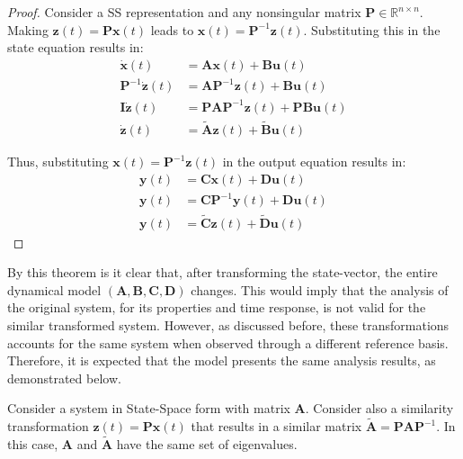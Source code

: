 \documentclass[a4paper,11pt]{book}
\numberwithin{figure}{chapter}
\numberwithin{equation}{chapter}
\numberwithin{table}{chapter}
\newtheorem{theorem}{Theorem}[chapter]
\theoremstyle{definition}
\newcounter{boxed-theorem}
\newenvironment{boxed-theorem}[1]
{\begin{shaded} \begin{theorem}{#1}}
{\end{theorem} \end{shaded}}
\newcounter{boxed-definition}
\begin{document}
\begin{proof}
    Consider a SS representation and any nonsingular matrix $\bm{P} \in \mathbb{R}^{n \times n}$. Making $\bm{z}(t) = \bm{P} \bm{x}(t)$ leads to $\bm{x}(t) = \bm{P}^{-1} \bm{z}(t)$. Substituting this in the state equation results in:
    \begin{equation}
    \begin{split}
        \dot{\bm{x}}(t) &= \bm{A} \bm{x}(t) + \bm{B} \bm{u}(t) \\
        \bm{P}^{-1} \dot{\bm{z}}(t) &= \bm{A} \bm{P}^{-1} \bm{z}(t) + \bm{B} \bm{u}(t) \\
        \bm{I} \dot{\bm{z}}(t) &= \bm{P} \bm{A} \bm{P}^{-1} \bm{z}(t) + \bm{P} \bm{B} \bm{u}(t) \\
        \dot{\bm{z}}(t) &= \tilde{\bm{A}} \bm{z}(t) + \tilde{\bm{B}} \bm{u}(t)
    \end{split}
    \end{equation}
    
    Thus, substituting $\bm{x}(t) = \bm{P}^{-1} \bm{z}(t)$ in the output equation results in:
    \begin{equation}
    \begin{split}
        \bm{y}(t) &= \bm{C} \bm{x}(t) + \bm{D} \bm{u}(t) \\
        \bm{y}(t) &= \bm{C} \bm{P}^{-1} \bm{y}(t) + \bm{D} \bm{u}(t) \\
        \bm{y}(t) &= \tilde{\bm{C}} \bm{z}(t) + \tilde{\bm{D}} \bm{u}(t)
    \end{split}
    \end{equation}
\end{proof}

By this theorem is it clear that, after transforming the state-vector, the entire dynamical model $(\bm{A}, \bm{B}, \bm{C}, \bm{D})$ changes. This would imply that the analysis of the original system, for its properties and time response, is not valid for the similar transformed system. However, as discussed before, these transformations accounts for the same system when observed through a different reference basis. Therefore, it is expected that the model presents the same analysis results, as demonstrated below.

\begin{boxed-theorem}{} \label{th:simTrans01}
    Consider a system in State-Space form with matrix $\bm{A}$. Consider also a similarity transformation $\bm{z}(t) = \bm{P} \bm{x}(t)$ that results in a similar matrix $\tilde{\bm{A}} = \bm{P} \bm{A} \bm{P}^{-1}$. In this case, $\bm{A}$ and $\tilde{\bm{A}}$ have the same set of eigenvalues.
\end{boxed-theorem}
\end{document}
